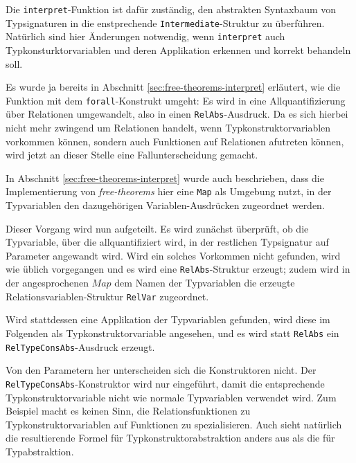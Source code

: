 Die \texttt{interpret}-Funktion ist dafür zuständig, den abstrakten Syntaxbaum von Typ\-sig\-na\-tu\-ren in die enstprechende
\texttt{Intermediate}-Struktur zu überführen. Natürlich sind hier Änderungen notwendig, wenn \texttt{interpret} auch
Typkonsturktorvariablen und deren Applikation erkennen und korrekt behandeln soll.

Es wurde ja bereits in Abschnitt \ref{sec:free-theorems-interpret} erläutert, wie die Funktion mit dem \texttt{forall}-Konstrukt
umgeht: Es wird in eine Allquantifizierung über Relationen umgewandelt, also in einen \texttt{RelAbs}-Ausdruck.
Da es sich hierbei nicht mehr zwingend um Relationen handelt, wenn Typkonstruktorvariablen vorkommen können, sondern auch
Funktionen auf Relationen afutreten können, wird jetzt an dieser Stelle eine Fallunterscheidung gemacht.

In Abschnitt \ref{sec:free-theorems-interpret} wurde auch beschrieben, dass die Implementierung von \textit{free-theorems} hier eine
\texttt{Map} als Umgebung nutzt, in der Typvariablen den dazugehörigen Variablen-Ausdrücken zugeordnet werden. 

Dieser Vorgang wird nun aufgeteilt. Es wird zunächst überprüft, ob die Typvariable, über die allquantifiziert wird, in der
restlichen Typsignatur auf Parameter angewandt wird. Wird ein solches Vorkommen nicht gefunden, wird wie üblich vorgegangen
und es wird eine \texttt{RelAbs}-Struktur erzeugt; zudem wird in der angesprochenen $Map$ dem Namen der Typvariablen
die erzeugte Relationsvariablen-Struktur \texttt{RelVar} zugeordnet.

Wird stattdessen eine Applikation der Typvariablen gefunden, wird diese im Folgenden als Typkonstruktorvariable angesehen,
und es wird statt \texttt{RelAbs} ein \texttt{RelTypeConsAbs}-Ausdruck erzeugt.

Von den Parametern her unterscheiden sich die Konstruktoren nicht. Der \texttt{RelTypeConsAbs}-Konstruktor wird nur
eingeführt, damit die entsprechende Typkonstruktorvariable nicht wie normale Typvariablen verwendet wird.
Zum Beispiel macht es keinen Sinn, die Relationsfunktionen zu Typkonstruktorvariablen auf
Funktionen zu spezialisieren. Auch sieht natürlich die resultierende Formel für Typkonstruktorabstraktion anders aus als die
für Typabstraktion.


